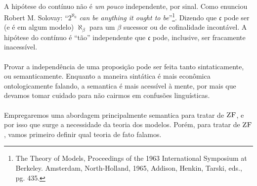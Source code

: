     \paragraph{}
        A hipótese do contínuo não é \emph{um pouco} independente, por sinal.
        Como enunciou Robert M. Solovay: 
        ``\emph{$2^{\aleph_0}$ can be anything it ought to be}''\footnote{
            The Theory of Models, Proceedings of the 1963 International Symposium at Berkeley. Amsterdam, North-Holland, 1965, Addison, Henkin, Tarski, eds., pg. 435.
        }. Dizendo que $\mathfrak{c}$ pode ser (e é em algum modelo) 
        $\aleph_\beta$ para um $\beta$ sucessor ou de cofinalidade incontável.
        A hipótese do contínuo é ``tão'' independente que $\mathfrak{c}$ pode,
        inclusive, ser fracamente inacessível. 
    \paragraph{}
        Provar a independência de uma proposição pode ser feita tanto 
        sintaticamente, ou semanticamente. Enquanto a maneira sintática 
        é mais econômica ontologicamente falando, a semantica é mais 
        acessível à mente, por mais que devamos tomar cuidado para não 
        cairmos em confusões linguísticas. 
    \paragraph{}
        Empregaremos uma abordagem principalmente semantica para tratar 
        de $\text{\sc ZF}$, e por isso que surge a necessidade da teoria dos modelos.
        Porém, para tratar de $\text{\sc ZF}$, vamos primeiro definir qual teoria de 
        fato falamos.
